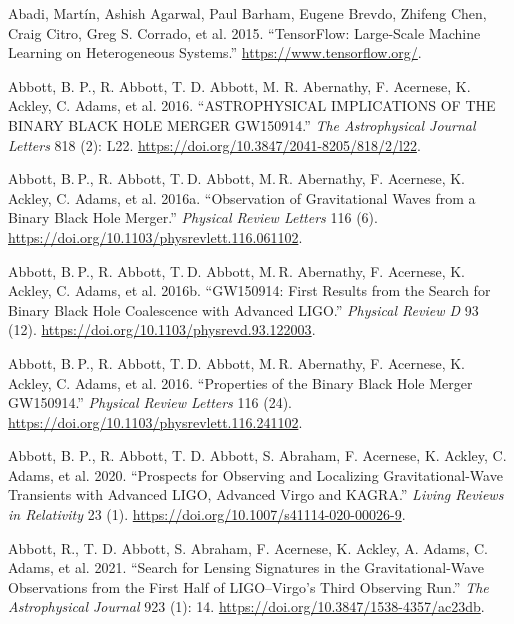 \documentclass[10pt,a4paper,onecolumn]{article}
\newlength{\cslhangindent}
\newenvironment{CSLReferences}[3] %
 {%
  \setlength{\parindent}{0pt}
  \ifodd #1 \everypar{\setlength{\hangindent}{\cslhangindent}}\ignorespaces\fi
  \ifnum #2 > 0
  \setlength{\parskip}{#2\baselineskip}
  \fi
 }%
 {}
\begin{document}
\label{refs}
\begin{CSLReferences}{1}{0}
\bibitem[\citeproctext]{ref-tensorflow:2015}
Abadi, Martín, Ashish Agarwal, Paul Barham, Eugene Brevdo, Zhifeng Chen,
Craig Citro, Greg S. Corrado, et al. 2015. {``{TensorFlow}: Large-Scale
Machine Learning on Heterogeneous Systems.''}
\url{https://www.tensorflow.org/}.

Abbott, B. P., R. Abbott, T. D. Abbott, M. R. Abernathy, F. Acernese, K.
Ackley, C. Adams, et al. 2016. {``ASTROPHYSICAL IMPLICATIONS OF THE
BINARY BLACK HOLE MERGER GW150914.''} \emph{The Astrophysical Journal
Letters} 818 (2): L22.
\url{https://doi.org/10.3847/2041-8205/818/2/l22}.

Abbott, B. P., R. Abbott, T. D. Abbott, M. R. Abernathy, F. Acernese, K.
Ackley, C. Adams, et al. 2016a. {``Observation of Gravitational Waves
from a Binary Black Hole Merger.''} \emph{Physical Review Letters} 116
(6). \url{https://doi.org/10.1103/physrevlett.116.061102}.

Abbott, B. P., R. Abbott, T. D. Abbott, M. R. Abernathy, F. Acernese, K.
Ackley, C. Adams, et al. 2016b. {``GW150914: First Results from the
Search for Binary Black Hole Coalescence with Advanced LIGO.''}
\emph{Physical Review D} 93 (12).
\url{https://doi.org/10.1103/physrevd.93.122003}.

Abbott, B. P., R. Abbott, T. D. Abbott, M. R. Abernathy, F. Acernese, K.
Ackley, C. Adams, et al. 2016. {``Properties of the Binary Black Hole
Merger GW150914.''} \emph{Physical Review Letters} 116 (24).
\url{https://doi.org/10.1103/physrevlett.116.241102}.

Abbott, B. P., R. Abbott, T. D. Abbott, S. Abraham, F. Acernese, K.
Ackley, C. Adams, et al. 2020. {``Prospects for Observing and Localizing
Gravitational-Wave Transients with Advanced LIGO, Advanced Virgo and
KAGRA.''} \emph{Living Reviews in Relativity} 23 (1).
\url{https://doi.org/10.1007/s41114-020-00026-9}.

Abbott, R., T. D. Abbott, S. Abraham, F. Acernese, K. Ackley, A. Adams,
C. Adams, et al. 2021. {``Search for Lensing Signatures in the
Gravitational-Wave Observations from the First Half of LIGO--Virgo's
Third Observing Run.''} \emph{The Astrophysical Journal} 923 (1): 14.
\url{https://doi.org/10.3847/1538-4357/ac23db}.


\end{CSLReferences}
\end{document}
